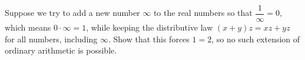 Suppose we try to add a new number $\infty$ to the real numbers so that $\dfrac1\infty=0$, which means $0\cdot\infty=1$, while keeping the distributive law $(x+y)z=xz+yz$ for all numbers, including $\infty$. Show that this forces $1=2$, so no such extension of ordinary arithmetic is possible.
